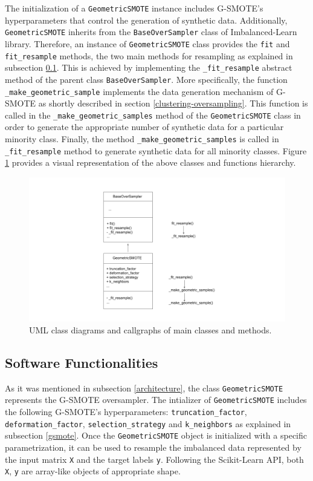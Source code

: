 \documentclass[preprint,12pt, a4paper]{elsarticle}
\begin{document}
The initialization of a \texttt{GeometricSMOTE} instance includes G-SMOTE's hyperparameters that control the generation of synthetic data. Additionally, \texttt{GeometricSMOTE} inherits from the \texttt{BaseOverSampler} class of Imbalanced-Learn library. Therefore, an instance of \texttt{GeometricSMOTE} class provides the \texttt{fit} and \texttt{fit\_resample} methods, the two main methods for resampling as explained in subsection \ref{functionality}. This is achieved by implementing the \texttt{\_fit\_resample} abstract method of the parent class \texttt{BaseOverSampler}. More specifically, the function \texttt{\_make\_geometric\_sample} implements the data generation mechanism of G-SMOTE as shortly described in section \ref{clustering-oversampling}. This function is called in the \texttt{\_make\_geometric\_samples} method of the \texttt{GeometricSMOTE} class in order to generate the appropriate number of synthetic data for a particular minority class. Finally, the method \texttt{\_make\_geometric\_samples} is called in \texttt{\_fit\_resample} method to generate synthetic data for all minority classes. Figure \ref{fig:class_diagram} provides a visual representation of the above classes and functions hierarchy.

\begin{figure}[H]
	\centering
	\includegraphics[width=1\linewidth]{../analysis/class_diagram}
	\caption{UML class diagrams and callgraphs of main classes and methods.}
	\label{fig:class_diagram}
\end{figure}

\subsection{Software Functionalities}
\label{functionality}

As it was mentioned in subsection \ref{architecture}, the class \texttt{GeometricSMOTE} represents the G-SMOTE oversampler. The intializer of \texttt{GeometricSMOTE} includes the following G-SMOTE's hyperparameters: \texttt{truncation\_factor}, \texttt{deformation\_factor}, \texttt{selection\_strategy} and \texttt{k\_neighbors} as explained in subsection \ref{gsmote}. Once the \texttt{GeometricSMOTE} object is initialized with a specific parametrization, it can be used to resample the imbalanced data represented by the input matrix \texttt{X} and the target labels \texttt{y}. Following the Scikit-Learn API, both \texttt{X}, \texttt{y} are array-like objects of appropriate shape.
\end{document}
